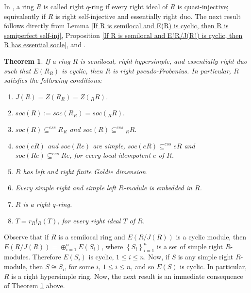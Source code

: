 \documentclass{amsart}
\newtheorem{theorem}{Theorem}[section]
\theoremstyle{plain}
\numberwithin{equation}{section}
\begin{document}
In \cite{JMS},
a ring $R$ is called right $q$-ring if every right ideal of $R$ is quasi-injective; equivalently if $R$ is right self-injective and essentially right duo. The next result follows directly from Lemma \ref{If R is semilocal and E(R) is cyclic, then R is semiperfect self-inj}, Proposition \ref{If R is semilocal and E(R/J(R)) is cyclic, then R has essential socle}, and \cite[Theorem 3.24 and Example 3.26]{NY}.



\begin{theorem}
\label{If R is semilocal ess rt duo with E(R) and E(R/J(R)) are cyclic, then R is rt PF-ring}If
a ring $R$ is semilocal, right hypersimple, and essentially right duo such that $E (R_{R})$ is cyclic, then $R$ is right pseudo-Frobenius. In particular, $R$ satisfies the following conditions: 


\begin{enumerate}
\item $J (R) =Z (R_{R}) =Z (_{R} R)$. 

\item $s o c (R):=s o c (R_{R}) =s o c (_{R} R)\text{.}$ 

\item $s o c (R)  \subseteq ^{e s s}R_{R}$ and $s o c (R)  \subseteq ^{e s s}\text{}_{R} R\text{.}$ 

\item $s o c (e R)$ and $s o c (R e)$ are simple, $s o c (e R)  \subseteq ^{e s s}e R$ and $s o c (R e) \subseteq ^{e s s}\text{}R e$, for every local idempotent $e$ of $R$. 

\item $R$ has left and right finite Goldie dimension. 

\item Every simple right and simple left
$R$-module is embedded in $R$. 

\item $R$ is a right $q$-ring. 

\item $T =r_{R} l_{R} (T)$, for every right ideal $T$ of $R$. \end{enumerate}
\end{theorem}

Observe that if $R$ is a semilocal ring and $E (R/J (R))$ is a cyclic module, then $E (R/J (R))  = \oplus _{i =1}^{n}E (S_{i})$, where $\left \{S_{i}\right \}_{i =1}^{n}$ is a set of simple right $R$-modules. Therefore $E (S_{i})$ is cyclic, $1 \leq i \leq n$. Now, if $S$ is any simple right $R$-module, then $S \cong S_{i}$, for some $i$, $1 \leq i \leq n$, and so $E (S)$ is cyclic. In particular, $R$ is a right hypersimple ring. Now, the next result is an immediate consequence of Theorem \ref{If R is semilocal ess rt duo with E(R) and E(R/J(R)) are cyclic, then R is rt PF-ring} above. 
\end{document}
